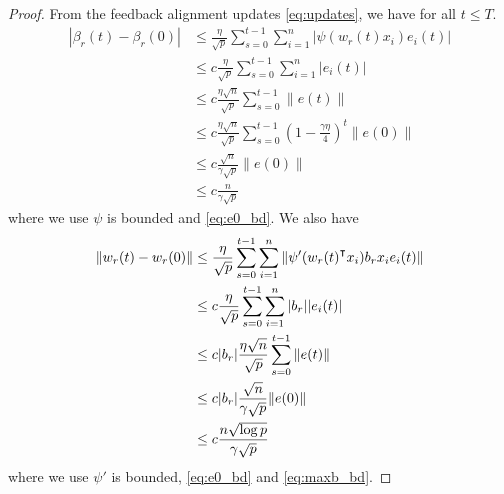 \begin{proof}
From the feedback alignment updates \eqref{eq:updates}, we have for all $t\leq T$.
\begin{equation*}
\begin{aligned}
    |\beta_r(t)-\beta_r(0)| &\leq \frac{\eta}{\sqrt p}\sum_{s=0}^{t-1}\sum_{i=1}^n |\psi(w_r(t)x_i)e_i(t)| \\
    &\leq c\frac{\eta}{\sqrt p}\sum_{s=0}^{t-1}\sum_{i=1}^n |e_i(t)| \\
    &\leq c\frac{\eta\sqrt n}{\sqrt p}\sum_{s=0}^{t-1} \|e(t)\| \\
    &\leq c\frac{\eta\sqrt n}{\sqrt p}\sum_{s=0}^{t-1}  (1-\frac{\gamma\eta}{4})^t\|e(0)\|  \\
    &\leq c\frac{\sqrt n}{\gamma\sqrt p}\|e(0)\| \\
    &\leq c\frac{n}{\gamma\sqrt p}
\end{aligned}
\end{equation*}
where we use $\psi$ is bounded and \eqref{eq:e0_bd}. We also have
\begin{equation*}
\begin{aligned}
    \|w_r(t)-w_r(0)\| &\leq \frac{\eta}{\sqrt p}\sum_{s=0}^{t-1}\sum_{i=1}^n \|\psi'(w_r(t)\transpose x_i)b_rx_i e_i(t)\| \\
    & \leq c\frac{\eta}{\sqrt p}\sum_{s=0}^{t-1}\sum_{i=1}^n |b_r| |e_i(t)| \\
    & \leq c|b_r|\frac{\eta\sqrt n}{\sqrt p}\sum_{s=0}^{t-1} \|e(t)\| \\
    & \leq c|b_r|\frac{\sqrt n}{\gamma\sqrt p}\|e(0)\| \\
    & \leq c\frac{n\sqrt{\log p}}{\gamma\sqrt p}
\end{aligned}
\end{equation*}
where we use $\psi'$ is bounded, \eqref{eq:e0_bd} and \eqref{eq:maxb_bd}.
\end{proof}

